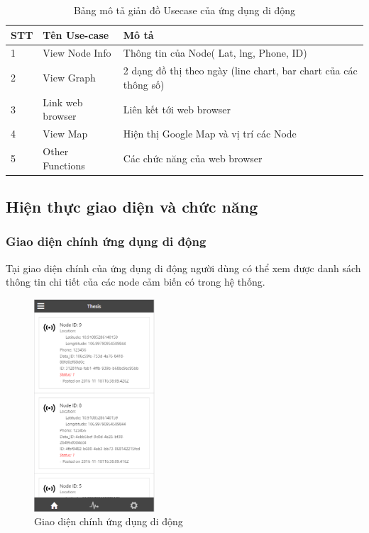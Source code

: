 \begin{table}[]
\centering
\caption{Bảng mô tả giản đồ Usecase của ứng dụng di động}
\label{table:usecase_mobile}
\begin{tabular}{|l|l|l|}
\hline
STT & Tên Use-case     & Mô tả                                                            \\ \hline
1   & View Node Info   & Thông tin của Node( Lat, lng, Phone, ID)                         \\ \hline
2   & View Graph       & 2 dạng đồ thị theo ngày (line chart, bar chart của các thông số) \\ \hline
3   & Link web browser & Liên kết tới web browser                                         \\ \hline
4   & View Map         & Hiện thị Google Map và vị trí các Node                           \\ \hline
5   & Other Functions  & Các chức năng của web browser                                    \\ \hline
\end{tabular}
\end{table}


\subsection{Hiện thực giao diện và chức năng}
\subsubsection*{Giao diện chính ứng dụng di động}
Tại giao diện chính của ứng dụng di động người dùng có thể xem được danh sách thông tin chi tiết của các node cảm biến có trong hệ thống.
\begin{center}
\begin{figure}[htp]
\centering    
\includegraphics[width=0.4\textwidth]{app_main}
\caption[Giao diện chính ứng dụng di động]{Giao diện chính ứng dụng di động}
\label{fig:app_main}
\end{figure}
\end{center}


